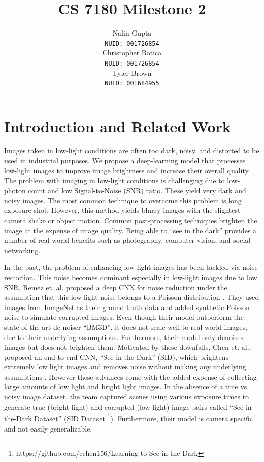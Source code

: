 \documentclass{article}
\title{CS 7180 Milestone 2}
\author{%
  Nalin Gupta \\
  \texttt{NUID: 001726854} \\
  \And
  Christopher Botica\\
  \texttt{NUID: 001726854} \\
  \And
  Tyler Brown\\
  \texttt{NUID: 001684955} \\
}
\begin{document}

\maketitle

\section{Introduction and Related Work}

Images taken in low-light conditions are often too dark, noisy, and distorted to be used in industrial purposes. We propose a deep-learning model that processes low-light
images to improve image brightness and increase their overall quality. The
problem with imaging in low-light conditions is challenging due to low-photon count and low Signal-to-Noise (SNR) ratio. These yield very dark and noisy
images. The most common technique to overcome this problem is long exposure
shot. However, this method yields blurry images with the slightest camera
shake
or object motion\cite{chen2018learning}. Common post-processing techniques brighten the image at the expense of image quality. Being able to ``see in the dark'' provides a
number of real-world benefits such as photography, computer vision, and
social networking. \newline

In the past, the problem of enhancing low light images has been tackled via
noise reduction. This noise becomes dominant especially in low-light images
due to low SNR. Remez et. al. proposed a deep CNN for noise reduction under
the assumption that this low-light noise belongs to a Poisson
distribution \cite{remez2017deep}.  They used images from ImageNet
\cite{imagenet_cvpr09} as their ground truth data
and added synthetic Poisson noise to simulate corrupted images. Even though
their model outperform the state-of-the art de-noiser ``BM3D'', it does not
scale well to real world images, due to their underlying assumptions.
Furthermore, their model only denoises images but does not brighten them.
Motivated by these downfalls, Chen et. al., proposed an end-to-end CNN,
``See-in-the-Dark'' (SID), which brightens extremely low light images and
removes noise without making any underlying assumptions
\cite{chen2018learning}. However these advances come with the added expense
of collecting large amounts of low
light and bright light images. In the absence of a true vs noisy image
dataset, the team captured scenes using various exposure times to generate
true (bright light) and corrupted (low light) image pairs called
``See-in-the-Dark Dataset'' (SID Dataset \footnote{https://github.com/cchen156/Learning-to-See-in-the-Dark}). Furthermore, their model is camera
specific and not easily generalizable.\newline
\end{document}
